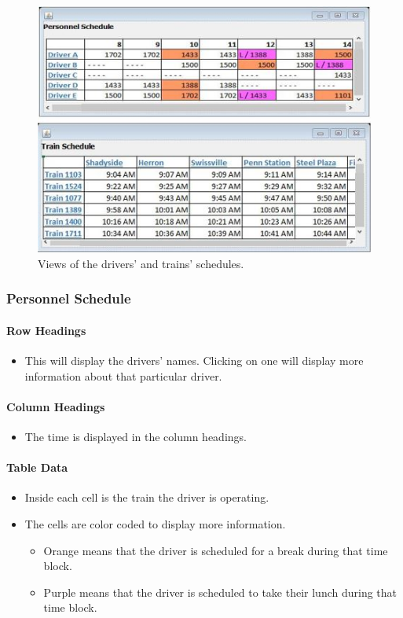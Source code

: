 \documentclass[letterpaper]{article}
\begin{document}
\begin{figure}[h!]
	\center
	\includegraphics[width=16cm]{schedule_views}
	\caption{Views of the drivers' and trains' schedules.}
\end{figure}

\subsubsection{Personnel Schedule}
\paragraph{Row Headings}
\begin{itemize}
	\item This will display the drivers' names. Clicking on one will display more information about that particular driver.
\end{itemize}
\paragraph{Column Headings}
\begin{itemize}
	\item The time is displayed in the column headings.
\end{itemize}
\paragraph{Table Data}
\begin{itemize}
	\item Inside each cell is the train the driver is operating.
	\item The cells are color coded to display more information.
	\begin{itemize}
		\item Orange means that the driver is scheduled for a break during that time block.
		\item Purple means that the driver is scheduled to take their lunch during that time block.
	\end{itemize}
\end{itemize}
\end{document}
